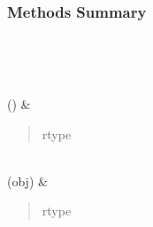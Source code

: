 \documentclass[letterpaper,10pt,english]{sphinxmanual}
\begin{document}
\begin{fulllineitems}
\begin{savenotes}
\begin{longtable}[c]{}
\begin{quote}
\begin{description}
\end{description}\end{quote}

\\
\hline
\end{longtable}\sphinxatlongtableend\end{savenotes}
\subsubsection*{Methods Summary}


\begin{savenotes}\sphinxatlongtablestart\begin{longtable}[c]{}
\hline

\endfirsthead

%
{}\\
\hline

\endhead

\hline
{}\\
\endfoot

\endlastfoot

\sphinxAtStartPar
{\hyperref[\detokenize{api/seyfert.cosmology.c_ells.H5Cl:seyfert.cosmology.c_ells.H5Cl.readBuildingData}]{}}()
&
\sphinxAtStartPar
\begin{quote}\begin{description}
\item[{rtype}] \leavevmode
\sphinxAtStartPar
{}

\end{description}\end{quote}

\\
\hline
\sphinxAtStartPar
{\hyperref[\detokenize{api/seyfert.cosmology.c_ells.H5Cl:seyfert.cosmology.c_ells.H5Cl.writeObjectToFile}]{}}(obj)
&
\sphinxAtStartPar
\begin{quote}\begin{description}
\item[{rtype}] \leavevmode
\sphinxAtStartPar
{}

\end{description}\end{quote}


\end{longtable}
\end{savenotes}
\end{fulllineitems}
\end{document}
